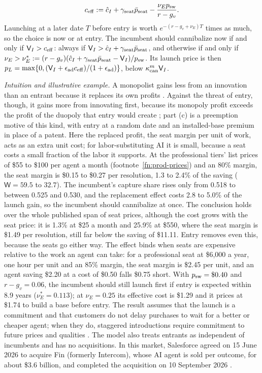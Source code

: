 \begin{proposition}[Cannibalization]
\begin{enumerate}
\[
c_{\rm eff}:=\hat c_I+\gamma_{\rm seat}\bar p_{\rm seat}-\frac{\nu_Ep_{\rm sw}}{r-g_v} .
\]
Launching at a later date $T$ before entry is worth $e^{-(r-g_v+\nu_E)T}$ times as much, so the choice is now or at entry. The incumbent should cannibalize now if and only if $\mathsf V_I>c_{\rm eff}$: always if $\mathsf V_I>\hat c_I+\gamma_{\rm seat}\bar p_{\rm seat}$, and otherwise if and only if $\nu_E>\nu_E^*:=(r-g_v)(\hat c_I+\gamma_{\rm seat}\bar p_{\rm seat}-\mathsf V_I)/p_{\rm sw}$. Its launch price is then $p_L=\max\{0,(\mathsf V_I+\epsilon_{\rm ad}c_{\rm eff})/(1+\epsilon_{\rm ad})\}$, below $\kappa^m_{\rm can}\mathsf V_I$.
\end{enumerate}
\end{proposition}

\noindent\emph{Intuition and illustrative example.} A monopolist gains less from an innovation than an entrant because it replaces its own profits \citep{arrow1962economic}. Against the threat of entry, though, it gains more from innovating first, because its monopoly profit exceeds the profit of the duopoly that entry would create \citep{gilbert1982preemptive}; part (c) is a preemption motive of this kind, with entry at a random date and an installed-base premium in place of a patent. Here the replaced profit, the seat margin per unit of work, acts as an extra unit cost; for labor-substituting AI it is small, because a seat costs a small fraction of the labor it supports. At the professional tiers' list prices of \$55 to \$100 per agent a month (footnote~\ref{fn:prod-prices}) and an 80\% margin, the seat margin is \$0.15 to \$0.27 per resolution, 1.3 to 2.4\% of the saving ($\mathsf W=59.5$ to $32.7$). The incumbent's capture share rises only from 0.518 to between 0.525 and 0.530, and the replacement effect costs 2.8 to 5.0\% of the launch gain, so the incumbent should cannibalize at once. The conclusion holds over the whole published span of seat prices, although the cost grows with the seat price: it is 1.3\% at \$25 a month and 25.9\% at \$550, where the seat margin is \$1.49 per resolution, still far below the saving of \$11.11. Entry removes even this, because the seats go either way. The effect binds when seats are expensive relative to the work an agent can take: for a professional seat at \$6{,}000 a year, one hour per unit and an 85\% margin, the seat margin is \$2.45 per unit, and an agent saving \$2.20 at a cost of \$0.50 falls \$0.75 short. With $p_{\rm sw}=\$0.40$ and $r-g_v=0.06$, the incumbent should still launch first if entry is expected within 8.9 years ($\nu_E^*=0.113$); at $\nu_E=0.25$ its effective cost is \$1.29 and it prices at \$1.74 to build a base before entry. The result assumes that the launch is a commitment and that customers do not delay purchases to wait for a better or cheaper agent; when they do, staggered introductions require commitment to future prices and qualities \citep{moorthy1992market}. The model also treats entrants as independent of incumbents and has no acquisitions. In this market, Salesforce agreed on 15 June 2026 to acquire Fin (formerly Intercom), whose AI agent is sold per outcome, for about \$3.6 billion, and completed the acquisition on 10 September 2026 \citep{salesforce2026finagree,salesforce2026finclose}.

